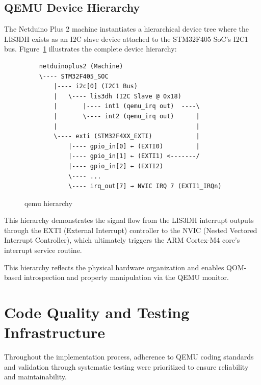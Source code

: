 
\subsection{QEMU Device Hierarchy}

The Netduino Plus 2 machine instantiates a hierarchical device tree where the LIS3DH exists as an I2C slave device attached to the STM32F405 SoC's I2C1 bus. Figure~\ref{fig:qemu_hierarchy} illustrates the complete device hierarchy:

\begin{figure}[H]
    \centering
    \begin{verbatim}
    netduinoplus2 (Machine)
    \---- STM32F405_SOC
        |---- i2c[0] (I2C1 Bus)
        |   \---- lis3dh (I2C Slave @ 0x18)
        |       |---- int1 (qemu_irq out)  ----\
        |       \---- int2 (qemu_irq out)      |
        |                                      |
        \---- exti (STM32F4XX_EXTI)            |
            |---- gpio_in[0] ← (EXTI0)         |
            |---- gpio_in[1] ← (EXTI1) <-------/
            |---- gpio_in[2] ← (EXTI2)
            \---- ...
            \---- irq_out[7] → NVIC IRQ 7 (EXTI1_IRQn)
    \end{verbatim}
    \caption{qemu hierarchy}
    \label{fig:qemu_hierarchy}
\end{figure}

This hierarchy demonstrates the signal flow from the LIS3DH interrupt outputs through the EXTI (External Interrupt) controller to the NVIC (Nested Vectored Interrupt Controller), which ultimately triggers the ARM Cortex-M4 core's interrupt service routine.





This hierarchy reflects the physical hardware organization and enables QOM-based introspection and property manipulation via the QEMU monitor.


\section{Code Quality and Testing Infrastructure}

\label{sec:impl_quality}

Throughout the implementation process, adherence to QEMU coding standards and validation through systematic testing were prioritized to ensure reliability and maintainability.

